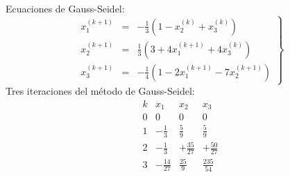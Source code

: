 \documentclass[12pt]{article}
\begin{document}
\begin{ejercicio}
\begin{enumerate}
        Ecuaciones de Gauss-Seidel:
        \begin{equation*}
            \left. \begin{array}{rcl}
                x_1^{(k+1)} &=& -\frac{1}{3}(1-x_2^{(k)}+x_3^{(k)}) \\
                x_2^{(k+1)} &=& \frac{1}{3}(3+4x_1^{(k+1)}+4x_3^{(k)}) \\
                x_3^{(k+1)} &=& -\frac{1}{4}(1-2x_1^{(k+1)}-7x_2^{(k+1)})
            \end{array}\right\}
        \end{equation*}
        Tres iteraciones del método de Gauss-Seidel:
        \begin{equation*}
            \begin{array}{c|ccc}
                k & x_1 & x_2 & x_3 \\ \hline
                0 & 0 & 0 & 0 \\
                1 & -\frac{1}{3} & \frac{5}{9} & \frac{5}{9} \\
                2 & -\frac{1}{3} & +\frac{35}{27} & +\frac{50}{27} \\
                3 & -\frac{14}{27}  & \frac{25}{9} & \frac{235}{54} \\
            \end{array}
        \end{equation*}


\end{enumerate}
\end{ejercicio}
\end{document}
